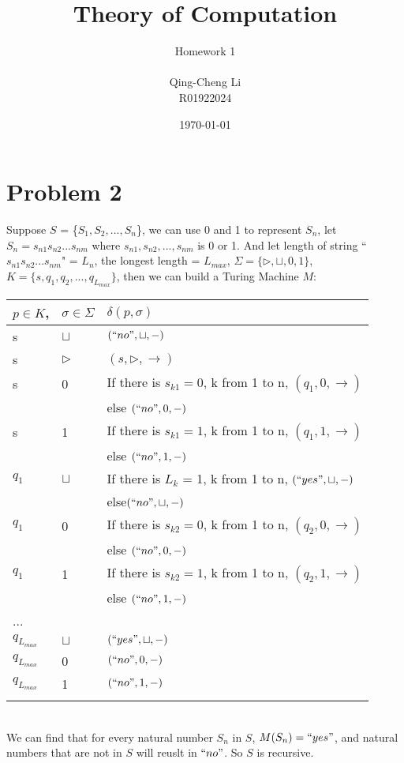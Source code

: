 \documentclass[11pt]{article}
\title{\textbf{Theory of Computation}}
\author{Homework 1\\
					\\
		Qing-Cheng Li\\
		R01922024}
\date{\today}
\begin{document}
\maketitle
\setcounter{section}{1}
\section{Problem 2}
Suppose $S$ = \{$S_1, S_2, ..., S_n$\}, we can use 0 and 1 to represent $S_n$, let $S_n = s_{n1}s_{n2}...s_{nm}$ where $s_{n1}, s_{n2}, ..., s_{nm}$ is 0 or 1. And let length of string ``$s_{n1}s_{n2}...s_{nm}$" = $L_n$, the longest length = $L_{max}$, $\Sigma = \{\triangleright,\sqcup,0,1\}$, $K = \{s,q_1,q_2,...,q_{L_{max}}\}$, then we can build a Turing Machine $M$:\\

\begin{tabular}{ll||l}
	$p \in K$, & $\sigma \in \Sigma$ & $\delta(p,\sigma)$\\
	\hline
	s & $\sqcup$ & $(``no",\sqcup,-)$\\
	s & $\triangleright$ & $(s,\triangleright,\rightarrow)$\\
	s & 0& If there is $s_{k1}=0$, k from 1 to n, $(q_1,0,\rightarrow)$ \\
	  &  & else $(``no",0,-)$\\
	s & 1& If there is $s_{k1}=1$, k from 1 to n, $(q_1,1,\rightarrow)$ \\
	  &  & else $(``no",1,-)$\\
	\hline
	$q_1$ & $\sqcup$ & If there is $L_k$ = 1, k from 1 to n, $(``yes",\sqcup,-)$\\
	&& else$(``no",\sqcup,-)$\\
	$q_1$ & 0& If there is $s_{k2}=0$, k from 1 to n, $(q_2,0,\rightarrow)$\\
	&&else $(``no",0,-)$\\
	$q_1$ & 1& If there is $s_{k2}=1$, k from 1 to n, $(q_2,1,\rightarrow)$\\
	&&else $(``no",1,-)$\\
	\hline 
	... \\
	\hline
	$q_{L_{max}}$ & $\sqcup$ & $(``yes",\sqcup,-)$\\
	$q_{L_{max}}$ & 0& $(``no",0,-)$\\
	$q_{L_{max}}$ & 1& $(``no",1,-)$\\
	\hline\\
\end{tabular}
\\We can find that for every natural number $S_n$ in $S$, $M(S_n) = ``yes"$, and natural numbers that are not in $S$ will reuslt in $``no"$. So $S$ is recursive.
\end{document}
